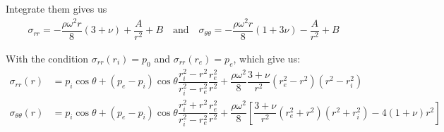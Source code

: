 \documentclass[a4paper,12pt]{book}
\begin{document}
Integrate them gives us
\begin{align}
    \sigma_{rr} = - \dfrac{\rho \omega^2 r}{8} (3 + \nu) + \dfrac{A}{r^2} + B
    \quad\text{and}\quad
    \sigma_{\theta \theta} = - \dfrac{\rho \omega^2 r}{8} (1 + 3\nu) - \dfrac{A}{r^2} + B
\end{align}

With the condition $\sigma_{rr}(r_i) = p_0$ and $\sigma_{rr}(r_e) = p_e$, which give us:
\begin{align}
    \sigma_{rr}(r) &= p_i \cos\theta + (p_e - p_i) \cos\theta \dfrac{r_i^2 - r^2}{r_i^2 - r_e^2}\dfrac{r_e^2}{r^2} + \dfrac{\rho \omega^2}{8} \dfrac{3 + \nu}{r^2} (r_e^2 - r^2)(r^2 - r_i^2)\\
    \sigma_{\theta \theta}(r) &= p_i \cos\theta + (p_e - p_i) \cos\theta \dfrac{r_i^2 + r^2}{r_i^2 - r_e^2}\dfrac{r_e^2}{r^2} + \dfrac{\rho \omega^2}{8} \left[ \dfrac{3 + \nu}{r^2} (r_e^2 + r^2)(r^2 + r_i^2) - 4(1 + \nu) r^2 \right]\\
\end{align}
\end{document}
